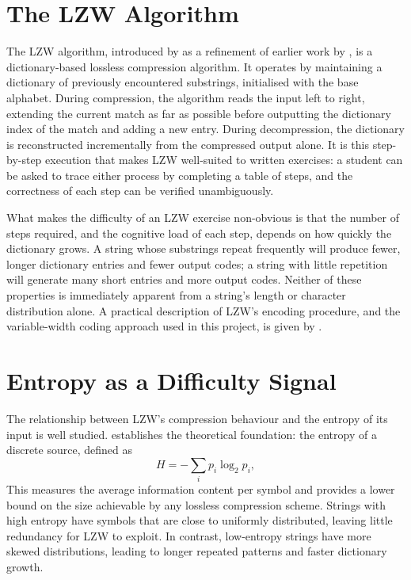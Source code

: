 \documentclass{l4proj}
\begin{document}
\section{The LZW Algorithm}
 
The LZW algorithm, introduced by \citet{Welch84} as a refinement of earlier work by \citet{ZivLempel77}, is a dictionary-based lossless compression algorithm. It operates by maintaining a dictionary of previously encountered substrings, initialised with the base alphabet. During compression, the algorithm reads the input left to right, extending the current match as far as possible before outputting the dictionary index of the match and adding a new entry. During decompression, the dictionary is reconstructed incrementally from the compressed output alone. It is this step-by-step execution that makes LZW well-suited to written exercises: a student can be asked to trace either process by completing a table of steps, and the correctness of each step can be verified unambiguously.
 
What makes the difficulty of an LZW exercise non-obvious is that the number of steps required, and the cognitive load of each step, depends on how quickly the dictionary grows. A string whose substrings repeat frequently will produce fewer, longer dictionary entries and fewer output codes; a string with little repetition will generate many short entries and more output codes. Neither of these properties is immediately apparent from a string's length or character distribution alone. A practical description of LZW's encoding procedure, and the variable-width coding approach used in this project, is given by \citet{Nelson89}.
 
\section{Entropy as a Difficulty Signal}
 
The relationship between LZW's compression behaviour and the entropy of its input is well studied. \citet{Shannon48} establishes the theoretical foundation: the entropy of a discrete source, defined as
\begin{equation}
    H = -\sum_{i} p_i \log_2 p_i,
\end{equation}
This measures the average information content per symbol and provides a lower bound on the size achievable by any lossless compression scheme. Strings with high entropy have symbols that are close to uniformly distributed, leaving little redundancy for LZW to exploit. In contrast, low-entropy strings have more skewed distributions, leading to longer repeated patterns and faster dictionary growth.
 
\end{document}
